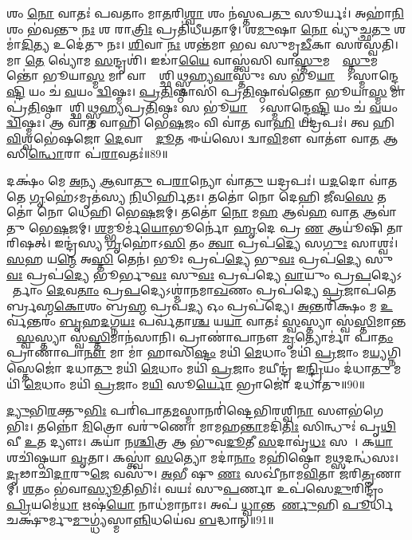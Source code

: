 𑌶𑌂 \ul{𑌨𑍋} 𑌵𑌾𑌤𑌃॑ 𑌪𑌵𑌤𑌾𑌂 𑌮𑌾\ul{𑌤}𑌰𑌿\ul{𑌶𑍍𑌵𑌾} 𑌶𑌂 𑌨॑𑌸𑍍𑌤𑌪\ul{𑌤𑍁} 𑌸𑍂𑌰𑍍𑌯𑌃॑। 
𑌅𑌹𑌾॑\ul{𑌨𑌿}𑌶𑌂 𑌭॑𑌵𑌨𑍍𑌤𑍁 \ul{𑌨𑌃} 𑌶 𑌰𑌾\ul{𑌤𑍍𑌰𑌿𑌃} 𑌪𑍍𑌰𑌤𑌿॑𑌧𑍀𑌯𑌤𑌾𑌮𑍍। 
𑌶\ul{𑌮𑍁}𑌷𑌾 \ul{𑌨𑍋} 𑌵𑍍𑌯𑍁॑𑌚𑍍𑌛\ul{𑌤𑍁} 𑌶𑌮𑌾॑\ul{𑌦𑌿}𑌤𑍍𑌯 𑌉𑌦𑍇॑𑌤𑍁 𑌨𑌃। 
\ul{𑌶𑌿}𑌵𑌾 \ul{𑌨𑌃} 𑌶𑌨𑍍𑌤॑𑌮𑌾 𑌭𑌵 𑌸𑍁𑌮𑍃\ul{𑌡𑍀}𑌕𑌾 𑌸𑌰॑𑌸𑍍𑌵𑌤𑌿। 
𑌮𑌾 \ul{𑌤𑍇} 𑌵𑍍𑌯𑍋॑𑌮 \ul{𑌸}𑌨𑍍𑌦𑍃𑌶𑌿॑। 
𑌇𑌡𑌾॑\ul{𑌯𑍈} 𑌵𑌾𑌸𑍍𑌤𑍍𑌵॑𑌸𑌿 𑌵𑌾\ul{𑌸𑍍𑌤𑍁}𑌮𑌦𑍍𑌵𑌾᳚\ul{𑌸𑍍𑌤𑍁}𑌮𑌨𑍍𑌤𑍋॑ 𑌭𑍂𑌯𑌾\ul{𑌸𑍍𑌮} 𑌮𑌾 𑌵𑌾𑌸𑍍𑌤𑍋᳚𑌶𑍍𑌛𑌿𑌥𑍍𑌸𑍍𑌮𑌹𑍍𑌯\ul{𑌵𑌾}𑌸𑍍𑌤𑍁𑌃 𑌸 𑌭𑍂॑\ul{𑌯𑌾}𑌦𑍍𑌯𑍋᳚𑌽𑌸𑍍𑌮𑌾𑌨𑍍𑌦𑍍𑌵𑍇\ul{𑌷𑍍𑌟𑌿} 𑌯𑌂 𑌚॑ \ul{𑌵}𑌯𑌂 \ul{𑌦𑍍𑌵𑌿}𑌷𑍍𑌮𑌃। 
\ul{𑌪𑍍𑌰}\ul{𑌤𑌿}𑌷𑍍𑌠𑌾𑌸𑌿॑ 𑌪𑍍𑌰\ul{𑌤𑌿}𑌷𑍍𑌠𑌾𑌵॑𑌨𑍍𑌤𑍋 𑌭𑍂𑌯𑌾\ul{𑌸𑍍𑌮} 𑌮𑌾 𑌪𑍍𑌰॑\ul{𑌤𑌿}𑌷𑍍𑌠𑌾𑌯𑌾᳚𑌶𑍍𑌛𑌿𑌥𑍍𑌸𑍍𑌮𑌹𑍍𑌯𑌪𑍍𑌰\ul{𑌤𑌿}𑌷𑍍𑌠𑌃 𑌸 𑌭𑍂॑\ul{𑌯𑌾}𑌦𑍍𑌯𑍋᳚𑌽𑌸𑍍𑌮𑌾𑌨𑍍𑌦𑍍𑌵𑍇\ul{𑌷𑍍𑌟𑌿} 𑌯𑌂 𑌚॑ \ul{𑌵}𑌯𑌂 \ul{𑌦𑍍𑌵𑌿}𑌷𑍍𑌮𑌃। 
𑌆 𑌵𑌾॑𑌤 𑌵𑌾𑌹𑌿 𑌭𑍇\ul{𑌷}𑌜𑌂 𑌵𑌿 𑌵𑌾॑𑌤 𑌵𑌾\ul{𑌹𑌿} 𑌯𑌦𑍍𑌰𑌪𑌃॑। 
𑌤𑍍𑌵 𑌹𑌿 \ul{𑌵𑌿}𑌶𑍍𑌵𑌭𑍇॑𑌷𑌜𑍋 \ul{𑌦𑍇}𑌵𑌾𑌨𑌾𑌂᳚ \ul{𑌦𑍂}𑌤 𑌈𑌯॑𑌸𑍇। 
𑌦𑍍𑌵𑌾\ul{𑌵𑌿}𑌮𑍗 𑌵𑌾𑌤𑍗॑ 𑌵𑌾\ul{𑌤} 𑌆 𑌸𑌿\ul{𑌨𑍍𑌧𑍋}𑌰𑌾 𑌪॑\ul{𑌰𑌾}𑌵𑌤𑌃॑॥89॥

𑌦𑌕𑍍𑌷𑌂॑ 𑌮𑍇 \ul{𑌅}𑌨𑍍𑌯 \ul{𑌆}𑌵𑌾\ul{𑌤𑍁} 𑌪\ul{𑌰𑌾}𑌨𑍍𑌯𑍋 𑌵𑌾॑\ul{𑌤𑍁} 𑌯𑌦𑍍𑌰𑌪𑌃॑। 
𑌯\ul{𑌦}𑌦𑍋 𑌵𑌾॑𑌤𑌤𑍇 \ul{𑌗𑍃}𑌹𑍇॑𑌽𑌮𑍃𑌤॑𑌸𑍍𑌯 \ul{𑌨𑌿}𑌧𑌿𑌰𑍍\mbox{}\ul{𑌹𑌿}𑌤𑌃। 
𑌤𑌤𑍋॑ 𑌨𑍋 𑌦𑍇𑌹𑌿 \ul{𑌜𑍀}𑌵\ul{𑌸𑍇} 𑌤𑌤𑍋॑ 𑌨𑍋 𑌧𑍇𑌹𑌿 𑌭𑍇\ul{𑌷}𑌜𑌮𑍍। 
𑌤𑌤𑍋॑ \ul{𑌨𑍋} 𑌮\ul{𑌹} 𑌆𑌵॑\ul{𑌹} 𑌵𑌾\ul{𑌤} 𑌆𑌵𑌾॑𑌤𑍁 𑌭𑍇\ul{𑌷}𑌜𑌮𑍍। 
\ul{𑌶}𑌮𑍍𑌭𑍂𑌰𑍍𑌮॑\ul{𑌯𑍋}𑌭𑍂𑌰𑍍𑌨𑍋॑ \ul{𑌹𑍃}𑌦𑍇 𑌪𑍍𑌰 \ul{𑌣} 𑌆𑌯𑍂॑𑌷𑌿 𑌤𑌾𑌰𑌿𑌷𑌤𑍍। 
𑌇𑌨𑍍𑌦𑍍𑌰॑𑌸𑍍𑌯 \ul{𑌗𑍃}𑌹𑍋॑𑌽\ul{𑌸𑌿} 𑌤𑌂 \ul{𑌤𑍍𑌵𑌾} 𑌪𑍍𑌰𑌪॑\ul{𑌦𑍍𑌯𑍇} 𑌸\ul{𑌗𑍁𑌃} 𑌸𑌾𑌶𑍍𑌵𑌃॑। 
\ul{𑌸}𑌹 𑌯\ul{𑌨𑍍𑌮𑍇} 𑌅\ul{𑌸𑍍𑌤𑌿} 𑌤𑍇𑌨॑। 
𑌭𑍂𑌃 𑌪𑍍𑌰𑌪॑\ul{𑌦𑍍𑌯𑍇} 𑌭𑍁\ul{𑌵𑌃} 𑌪𑍍𑌰𑌪॑\ul{𑌦𑍍𑌯𑍇} 𑌸𑍁\ul{𑌵𑌃} 𑌪𑍍𑌰𑌪॑\ul{𑌦𑍍𑌯𑍇} 𑌭𑍂𑌰𑍍𑌭𑍁\ul{𑌵𑌃} 𑌸𑍁\ul{𑌵𑌃} 𑌪𑍍𑌰𑌪॑𑌦𑍍𑌯𑍇 \ul{𑌵𑌾}𑌯𑍁𑌂 𑌪𑍍𑌰\ul{𑌪}𑌦𑍍𑌯𑍇𑌽𑌨𑌾᳚𑌰𑍍𑌤𑌾𑌂 \ul{𑌦𑍇}𑌵\ul{𑌤𑌾𑌂} 𑌪𑍍𑌰\ul{𑌪}𑌦𑍍𑌯𑍇𑌽𑌶𑍍𑌮𑌾॑𑌨𑌮𑌾\ul{𑌖}𑌣𑌂 𑌪𑍍𑌰𑌪॑𑌦𑍍𑌯𑍇 \ul{𑌪𑍍𑌰}𑌜𑌾𑌪॑𑌤𑍇𑌰𑍍𑌬𑍍𑌰𑌹𑍍𑌮\ul{𑌕𑍋}𑌶𑌂 𑌬𑍍𑌰\ul{𑌹𑍍𑌮} 𑌪𑍍𑌰𑌪॑\ul{𑌦𑍍𑌯} 𑌓𑌂 𑌪𑍍𑌰𑌪॑𑌦𑍍𑌯𑍇। 
\ul{𑌅}𑌨𑍍𑌤𑌰𑌿॑𑌕𑍍𑌷𑌂 𑌮 \ul{𑌉}𑌰𑍍𑌵॑𑌨𑍍𑌤𑌰𑌂॑ \ul{𑌬𑍃}𑌹\ul{𑌦}𑌗𑍍𑌨\ul{𑌯𑌃} 𑌪𑌰𑍍𑌵॑𑌤𑌾\ul{𑌶𑍍𑌚} 𑌯\ul{𑌯𑌾} 𑌵𑌾𑌤𑌃॑ \ul{𑌸𑍍𑌵}𑌸𑍍𑌤𑍍𑌯𑌾 𑌸𑍍𑌵॑\ul{𑌸𑍍𑌤𑌿}𑌮𑌾𑌨𑍍𑌤𑌯𑌾᳚ \ul{𑌸𑍍𑌵}𑌸𑍍𑌤𑍍𑌯𑌾 𑌸𑍍𑌵॑\ul{𑌸𑍍𑌤𑌿}𑌮𑌾𑌨॑𑌸𑌾𑌨𑌿। 
𑌪𑍍𑌰𑌾𑌣𑌾॑𑌪𑌾𑌨𑍗 \ul{𑌮𑍃}𑌤𑍍𑌯𑍋𑌰𑍍𑌮𑌾॑ 𑌪𑌾\ul{𑌤𑌂} 𑌪𑍍𑌰𑌾𑌣𑌾॑𑌪𑌾\ul{𑌨𑍗} 𑌮𑌾 𑌮𑌾॑ 𑌹𑌾𑌸𑌿\ul{𑌷𑍍𑌟𑌂} 𑌮𑌯𑌿॑ \ul{𑌮𑍇}𑌧𑌾𑌂 𑌮𑌯𑌿॑ \ul{𑌪𑍍𑌰}𑌜𑌾𑌂 𑌮\ul{𑌯𑍍𑌯}𑌗𑍍𑌨𑌿𑌸𑍍𑌤𑍇𑌜𑍋॑ 𑌦𑌧𑌾\ul{𑌤𑍁} 𑌮𑌯𑌿॑ \ul{𑌮𑍇}𑌧𑌾𑌂 𑌮𑌯𑌿॑ \ul{𑌪𑍍𑌰}𑌜𑌾𑌂 𑌮𑌯𑍀𑌨𑍍𑌦𑍍𑌰॑ 𑌇\ul{𑌨𑍍𑌦𑍍𑌰𑌿}𑌯𑌂 𑌦॑𑌧𑌾\ul{𑌤𑍁} 𑌮𑌯𑌿॑ \ul{𑌮𑍇}𑌧𑌾𑌂 𑌮𑌯𑌿॑ \ul{𑌪𑍍𑌰}𑌜𑌾𑌂 𑌮\ul{𑌯𑌿} 𑌸𑍂\ul{𑌰𑍍𑌯𑍋} 𑌭𑍍𑌰𑌾𑌜𑍋॑ 𑌦𑌧𑌾𑌤𑍁॥90॥

\ul{𑌦𑍍𑌯𑍁}𑌭𑌿\ul{𑌰}𑌕𑍍𑌤𑍁\ul{𑌭𑌿𑌃} 𑌪𑌰𑌿॑𑌪𑌾𑌤\ul{𑌮}𑌸𑍍𑌮𑌾𑌨𑌰𑌿॑𑌷𑍍𑌟𑍇𑌭𑌿𑌰𑌶𑍍𑌵𑌿\ul{𑌨𑌾} 𑌸𑍗𑌭॑𑌗𑍇𑌭𑌿𑌃। 
𑌤𑌨𑍍𑌨𑍋॑ \ul{𑌮𑌿}𑌤𑍍𑌰𑍋 𑌵𑌰𑍁॑𑌣𑍋 𑌮𑌾𑌮𑌹\ul{𑌨𑍍𑌤𑌾}𑌮𑌦𑌿॑\ul{𑌤𑌿𑌃} 𑌸𑌿𑌨𑍍𑌧𑍁𑌃॑ 𑌪𑍃\ul{𑌥𑌿}𑌵𑍀 \ul{𑌉}𑌤 𑌦𑍍𑌯𑍗𑌃। 
𑌕𑌯𑌾॑ 𑌨\ul{𑌶𑍍𑌚𑌿}𑌤𑍍𑌰 𑌆 𑌭𑍁॑𑌵\ul{𑌦𑍂}𑌤𑍀 \ul{𑌸}𑌦𑌾𑌵𑍃॑\ul{𑌧𑌃} 𑌸𑌖𑌾᳚। 
𑌕\ul{𑌯𑌾} 𑌶𑌚𑌿॑𑌷𑍍𑌠𑌯𑌾 \ul{𑌵𑍃}𑌤𑌾। 
𑌕𑌸𑍍𑌤𑍍𑌵𑌾॑ \ul{𑌸}𑌤𑍍𑌯𑍋 𑌮𑌦𑌾॑\ul{𑌨𑌾𑌂} 𑌮𑌹𑌿॑𑌷𑍍𑌠𑍋 𑌮\ul{𑌥𑍍𑌸}𑌦𑌨𑍍𑌧॑𑌸𑌃। 
\ul{𑌦𑍃}𑌢𑌾𑌚𑌿॑\ul{𑌦𑌾}𑌰𑍁\ul{𑌜𑍇} 𑌵𑌸𑍁॑। 
\ul{𑌅}𑌭𑍀 𑌷𑍁 \ul{𑌣𑌃} 𑌸𑌖𑍀॑𑌨𑌾𑌮\ul{𑌵𑌿}𑌤𑌾 𑌜॑𑌰𑌿\ul{𑌤𑍄}𑌣𑌾𑌮𑍍। 
\ul{𑌶}𑌤𑌂 𑌭॑𑌵𑌾\ul{𑌸𑍍𑌯𑍂}𑌤𑌿𑌭𑌿𑌃॑। 
𑌵𑌯𑌃॑ 𑌸𑍁\ul{𑌪}𑌰𑍍𑌣𑌾 𑌉𑌪॑𑌸𑍇\ul{𑌦𑍁}𑌰𑌿𑌨𑍍𑌦𑍍𑌰𑌂॑ \ul{𑌪𑍍𑌰𑌿}𑌯𑌮𑍇॑\ul{𑌧𑌾} 𑌋𑌷॑\ul{𑌯𑍋} 𑌨𑌾𑌧॑𑌮𑌾𑌨𑌾𑌃। 
𑌅𑌪॑ \ul{𑌧𑍍𑌵𑌾}𑌨𑍍𑌤𑌮𑍂᳚\ul{𑌰𑍍𑌣𑍁}𑌹𑌿 \ul{𑌪𑍂}𑌰𑍍𑌧𑌿 𑌚𑌕𑍍𑌷𑍁॑𑌰𑍍𑌮𑍁\ul{𑌮𑍁}𑌗𑍍𑌧𑍍𑌯॑𑌸𑍍𑌮𑌾\ul{𑌨𑍍𑌨𑌿}𑌧𑌯𑍇॑𑌵 \ul{𑌬}𑌦𑍍𑌧𑌾𑌨𑍍॥91॥

